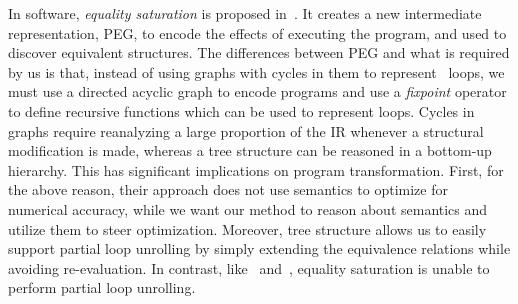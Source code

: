 In software, \emph{equality saturation} is proposed in~\cite{tate09}.  It
creates a new intermediate representation, PEG, to encode the effects of
executing the program, and used to discover equivalent structures.  The
differences between PEG and what is required by us is that, instead of using
graphs with cycles in them to represent \whilelit~loops, we must use a
directed acyclic graph to encode programs and use a \emph{fixpoint} operator
to define recursive functions which can be used to represent loops.  Cycles in
graphs require reanalyzing a large proportion of the IR whenever a structural
modification is made, whereas a tree structure can be reasoned in a bottom-up
hierarchy.  This has significant implications on program transformation.
First, for the above reason, their approach does not use semantics to optimize
for numerical accuracy, while we want our method to reason about semantics
and utilize them to steer optimization.  Moreover, tree structure allows us
to easily support partial loop unrolling by simply extending the equivalence
relations while avoiding re-evaluation.  In contrast, like~\cite{martel09}
and~\cite{damouche15}, equality saturation is unable to perform partial loop
unrolling.
